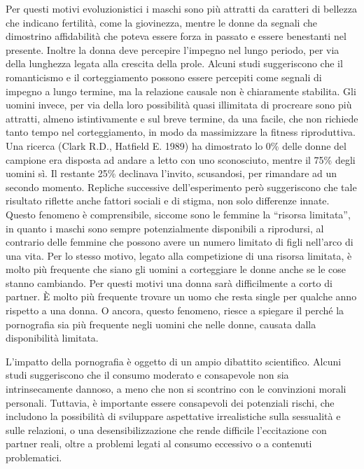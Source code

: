 \documentclass[12pt]{book} %
\begin{document}
Per questi motivi evoluzionistici i maschi sono più attratti da caratteri di bellezza che indicano fertilità, come la giovinezza, mentre le
donne da segnali che dimostrino affidabilità che poteva essere forza in passato e essere benestanti nel presente.
Inoltre la donna deve percepire l'impegno nel lungo periodo, per via della lunghezza legata
alla crescita della prole. Alcuni studi suggeriscono che il romanticismo e il corteggiamento possono essere percepiti come segnali di impegno a lungo termine, ma la relazione causale non è chiaramente stabilita. Gli uomini invece, per via della loro possibilità quasi
illimitata di procreare sono più attratti, almeno istintivamente e sul breve termine, da una facile, che non richiede
tanto tempo nel corteggiamento, in modo da massimizzare la fitness riproduttiva. Una ricerca (Clark R.D., Hatfield E.
1989) ha dimostrato lo 0\% delle donne del campione era disposta ad andare a letto con uno sconosciuto, mentre il 75\%
degli uomini sì. Il restante 25\% declinava l'invito, scusandosi, per rimandare ad un secondo
momento. Repliche successive dell'esperimento però suggeriscono che tale risultato riflette anche fattori sociali e di stigma, non solo differenze innate. Questo fenomeno è comprensibile, siccome sono le femmine la “risorsa limitata”, in quanto i maschi sono sempre
potenzialmente disponibili a riprodursi, al contrario delle femmine che possono avere un numero limitato di figli
nell'arco di una vita. Per lo stesso motivo, legato alla competizione di una risorsa limitata, è
molto più frequente che siano gli uomini a corteggiare le donne anche se le cose stanno cambiando. Per questi motivi
una donna sarà difficilmente a corto di partner. È molto più frequente trovare un uomo
che resta single per qualche anno rispetto a una donna. O ancora, questo fenomeno, riesce a spiegare il perché la
pornografia sia più frequente negli uomini che nelle donne, causata dalla disponibilità limitata. 

\begin{mdframed}[linewidth=1pt]
L'impatto della pornografia è oggetto di un ampio dibattito scientifico. Alcuni studi suggeriscono che il consumo moderato e consapevole non sia intrinsecamente dannoso, a meno che non si scontrino con le convinzioni morali personali. Tuttavia, è importante essere consapevoli dei potenziali rischi, che includono la possibilità di sviluppare aspettative irrealistiche sulla sessualità e sulle relazioni, o una desensibilizzazione che rende difficile l'eccitazione con partner reali, oltre a problemi legati al consumo eccessivo o a contenuti problematici.
\end{mdframed}
\end{document}

